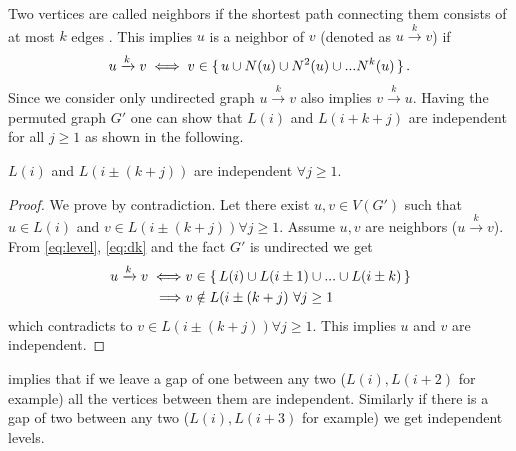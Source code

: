  Two vertices are called \DK neighbors if the shortest path connecting them consists of at most $k$ edges \cite{dist_k_def}. This implies $u$ is a \DK neighbor of $v$ (denoted as $u\xrightarrow{k}v$)  if
 \begin{equation}\label{eq:dk}
	  u\xrightarrow{k}v  \iff  v \in \set{ u \cup N(u) \cup N^2(u) \cup ... N^k(u) }.	 
 \end{equation}
 Since we consider only undirected graph $u\xrightarrow{k}v$ also implies $v\xrightarrow{k}u$. 
Having the permuted graph $G'$ one can show that $L(i)$ and $L(i+k+j)$  are \DK independent for all $j\geq1$ as shown in the following.
  \begin{corollary}\label{corollary_dk}
   $L(i)$ and $L(i\pm(k+j))$ are \DK independent $\forall j\geq1$. 
  \end{corollary}
  \begin{proof}
  	We prove by contradiction. Let there exist $u,v \in V(G')$ such that  $u \in L(i)$ and $v \in  L(i \pm (k+j)) \forall j\geq1$. Assume $u,v$ are \DK neighbors ($u\xrightarrow{k}v$). From \cref{eq:level}, \cref{eq:dk} and the fact $G'$ is undirected we get 
  	\begin{align*}
	  	u\xrightarrow{k}v \iff & v \in \set{L(i) \cup L(i \pm 1) \cup ... \cup L(i \pm k)} \\
	  	\implies & v \notin L(i \pm (k+j) \text{  } \forall j \geq 1
  	\end{align*}
  	which contradicts to $v \in L(i \pm (k+j) ) \forall j \geq 1$. This implies $u$ and $v$ are \DK independent.
  \end{proof}

 implies that if we leave a gap of \emph{\atleast} one \level between any two \levels ($L(i), L(i+2)$ for example) all the vertices between them are \DONE independent. Similarly if there is a gap of \emph{\atleast} two \levels between any two \levels ($L(i), L(i+3)$ for example) we get \DTWO independent levels.
  
